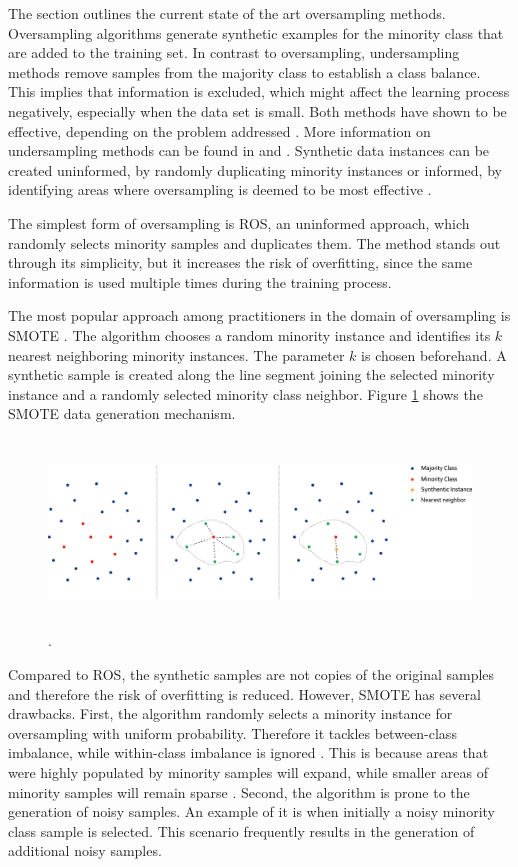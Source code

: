 \documentclass[parskip=full]{scrartcl}
\begin{document}
The section outlines the current state of the art oversampling methods. Oversampling algorithms generate synthetic examples for the minority class that are added to the training set. In contrast to oversampling, undersampling methods remove samples from the majority class to establish a class balance. This implies that information is excluded, which might affect the learning process negatively, especially when the data set is small. Both methods have shown to be effective, depending on the problem addressed \cite{Chawla2002}. More information on undersampling methods can be found in \cite{Ganganwar2012} and \cite{Yen2006}. Synthetic data instances can be created uninformed, by randomly duplicating minority instances or informed, by identifying areas where oversampling is deemed to be most effective \cite{Douzas2018}.

The simplest form of oversampling is ROS, an uninformed approach, which randomly selects minority samples and duplicates them. The method stands out through its simplicity, but it increases the risk of overfitting, since the same information is used multiple times during the training process.

The most popular approach among practitioners in the domain of oversampling is SMOTE \cite{Chawla2002}. The algorithm chooses a random minority instance and identifies its $ k $ nearest neighboring minority instances. The parameter $ k $ is chosen beforehand. A synthetic sample is created along the line segment joining the selected minority instance and a randomly selected minority class neighbor. Figure \ref{fig:Schubach} shows the SMOTE data generation mechanism.

\begin{figure}[H]
	\centering
	\includegraphics[width=16.5cm, height=5cm, keepaspectratio]{../analysis/fig1.png}
	.
	\label{fig:Schubach}
\end{figure}

Compared to ROS, the synthetic samples are not copies of the original samples and therefore the risk of overfitting is reduced. However, SMOTE has several drawbacks. First, the algorithm randomly selects a minority instance for oversampling with uniform probability. Therefore it tackles between-class imbalance, while within-class imbalance is ignored \cite{Nekooeimehr2016}. This is because areas that were highly populated by minority samples will expand, while smaller areas of minority samples will remain sparse \cite{Prati2004}. Second, the algorithm is prone to the generation of noisy samples. An example of it is when initially a noisy minority class sample is selected. This scenario frequently results in the generation of additional noisy samples.
\end{document}
